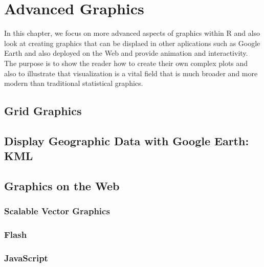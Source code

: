 \chapter{Advanced Graphics}

\begin{summary}
  In this chapter, we focus on more advanced aspects of graphics
  within R and also look at creating graphics that can be displaed in
  other aplications such as Google Earth and also deployed on the Web
  and provide animation and interactivity.  The purpose is to show the
  reader how to create their own complex plots and also to illustrate
  that visualization is a vital field that is much broader and more
  modern than traditional statistical graphics.
\end{summary}

\section{Grid Graphics}

\section{Display Geographic Data with Google Earth: KML}

\section{Graphics on the Web}

\subsection{Scalable Vector Graphics}

\subsection{Flash}

\subsection{JavaScript}
